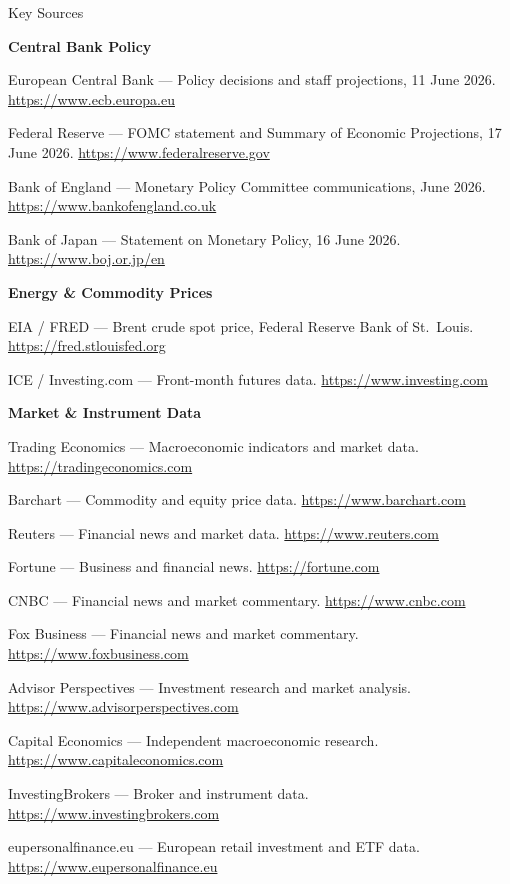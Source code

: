 \documentclass[11pt,a4paper]{article}
\begin{document}
\begin{fshfreferences*}{Key Sources}
\item \textbf{Central Bank Policy}
\item European Central Bank --- Policy decisions and staff projections, 11 June 2026. \url{https://www.ecb.europa.eu}
\item Federal Reserve --- FOMC statement and Summary of Economic Projections, 17 June 2026. \url{https://www.federalreserve.gov}
\item Bank of England --- Monetary Policy Committee communications, June 2026. \url{https://www.bankofengland.co.uk}
\item Bank of Japan --- Statement on Monetary Policy, 16 June 2026. \url{https://www.boj.or.jp/en}
\item \textbf{Energy \& Commodity Prices}
\item EIA / FRED --- Brent crude spot price, Federal Reserve Bank of St.\ Louis. \url{https://fred.stlouisfed.org}
\item ICE / Investing.com --- Front-month futures data. \url{https://www.investing.com}
\item \textbf{Market \& Instrument Data}
\item Trading Economics --- Macroeconomic indicators and market data. \url{https://tradingeconomics.com}
\item Barchart --- Commodity and equity price data. \url{https://www.barchart.com}
\item Reuters --- Financial news and market data. \url{https://www.reuters.com}
\item Fortune --- Business and financial news. \url{https://fortune.com}
\item CNBC --- Financial news and market commentary. \url{https://www.cnbc.com}
\item Fox Business --- Financial news and market commentary. \url{https://www.foxbusiness.com}
\item Advisor Perspectives --- Investment research and market analysis. \url{https://www.advisorperspectives.com}
\item Capital Economics --- Independent macroeconomic research. \url{https://www.capitaleconomics.com}
\item InvestingBrokers --- Broker and instrument data. \url{https://www.investingbrokers.com}
\item eupersonalfinance.eu --- European retail investment and ETF data. \url{https://www.eupersonalfinance.eu}

\end{fshfreferences*}
\end{document}
